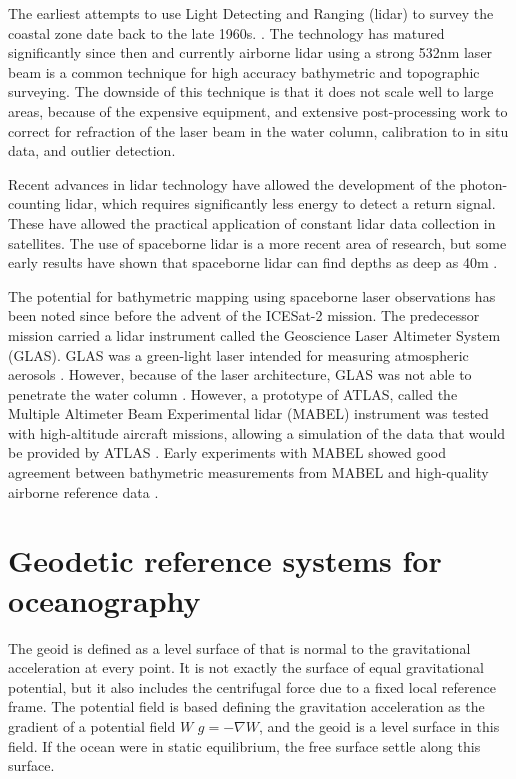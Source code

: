 The earliest attempts to use Light Detecting and Ranging (lidar) to survey the coastal zone date back to the late 1960s. \parencite{Bailly2016}. The technology has matured significantly since then and currently airborne lidar using a strong 532nm laser beam is a common technique for high accuracy bathymetric and topographic surveying. The downside of this technique is that it does not scale well to large areas, because of the expensive equipment, and extensive post-processing work to correct for refraction of the laser beam in the water column, calibration to in situ data, and outlier detection.

Recent advances in lidar technology have allowed the development of the photon-counting lidar, which requires significantly less energy to detect a return signal. These have allowed the practical application of constant lidar data collection in satellites. The use of spaceborne lidar is a more recent area of research, but some early results have shown that spaceborne lidar can find depths as deep as 40m \parencite{Parrish2019}.

The potential for bathymetric mapping using spaceborne laser observations has been noted since before the advent of the ICESat-2 mission. The predecessor mission carried a lidar instrument called the Geoscience Laser Altimeter System (GLAS). GLAS was a green-light laser intended for measuring atmospheric aerosols \parencite{Abshire2005}. However, because of the laser architecture, GLAS was not able to penetrate the water column \parencite{Forfinski-Sarkozi2016}. However, a prototype of ATLAS, called the Multiple Altimeter Beam Experimental lidar (MABEL) instrument was tested with high-altitude aircraft missions, allowing a simulation of the data that would be provided by ATLAS \parencite{Mcgill2013}. Early experiments with MABEL showed good agreement between bathymetric measurements from MABEL and high-quality airborne reference data \parencite{Jasinski2016,Forfinski-Sarkozi2016}.


\section{Geodetic reference systems for oceanography}

The geoid is defined as a level surface of that is normal to the gravitational acceleration at every point. It is not exactly the surface of equal gravitational potential, but it also includes the centrifugal force due to a fixed local reference frame. The potential field is based defining the gravitation acceleration as the gradient of a potential field $W$ $g= - \nabla W$, and the geoid is a level surface in this field. If the ocean were in static equilibrium, the free surface settle along this surface.

